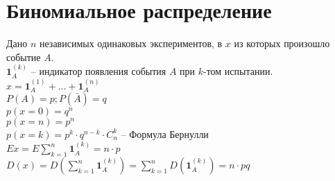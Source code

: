 \section{Биномиальное распределение}
Дано $n$ независимых одинаковых экспериментов, в $x$ из которых произошло событие $A$.\\
$\mathbf{1}_A^{(k)}$ -- индикатор появления события $A$ при $k$-том испытании.\\
$x = \mathbf{1}_A^{(1)}+...+\mathbf{1}_A^{(n)}$\\
$P(A)=p; P(\bar{A})=q$\\
$p(x=0)=q^n$\\
$p(x=n)=p^n$\\
$p(x=k)=p^k\cdot q^{n-k}\cdot C_n^k$ -- Формула Бернулли\\
$Ex = E\sum\limits_{k=1}^n \mathbf{1}_A^{(k)} = n\cdot p$\\
$D(x) = D\left(\sum\limits_{k=1}^n \mathbf{1}_A^{(k)}\right) = \sum\limits_{k=1}^n D\left(\mathbf{1}_A^{(k)}\right) = n\cdot pq$
